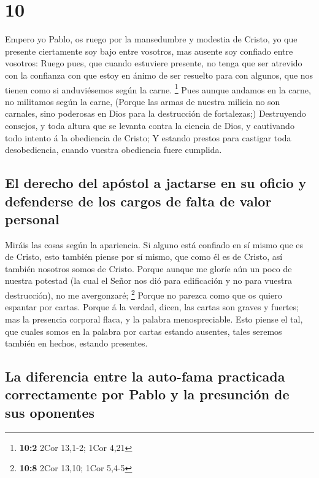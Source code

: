 \hypertarget{section-9}{%
\section{10}\label{section-9}}

 Empero yo Pablo, os ruego por la mansedumbre y modestia de
Cristo, yo que presente ciertamente soy bajo entre vosotros, mas ausente
soy confiado entre vosotros:  Ruego pues, que cuando
estuviere presente, no tenga que ser atrevido con la confianza con que
estoy en ánimo de ser resuelto para con algunos, que nos tienen como si
anduviésemos según la carne. \footnote{\textbf{10:2} 2Cor 13,1-2; 1Cor
  4,21}  Pues aunque andamos en la carne, no militamos según
la carne,  (Porque las armas de nuestra milicia no son
carnales, sino poderosas en Dios para la destrucción de fortalezas;)
 Destruyendo consejos, y toda altura que se levanta contra
la ciencia de Dios, y cautivando todo intento á la obediencia de Cristo;
 Y estando prestos para castigar toda desobediencia, cuando
vuestra obediencia fuere cumplida.

\hypertarget{el-derecho-del-apuxf3stol-a-jactarse-en-su-oficio-y-defenderse-de-los-cargos-de-falta-de-valor-personal}{%
\subsection{El derecho del apóstol a jactarse en su oficio y defenderse
de los cargos de falta de valor
personal}\label{el-derecho-del-apuxf3stol-a-jactarse-en-su-oficio-y-defenderse-de-los-cargos-de-falta-de-valor-personal}}

 Miráis las cosas según la apariencia. Si alguno está
confiado en sí mismo que es de Cristo, esto también piense por sí mismo,
que como él es de Cristo, así también nosotros somos de Cristo.
 Porque aunque me gloríe aún un poco de nuestra potestad (la
cual el Señor nos dió para edificación y no para vuestra destrucción),
no me avergonzaré; \footnote{\textbf{10:8} 2Cor 13,10; 1Cor 5,4-5}
 Porque no parezca como que os quiero espantar por cartas.
 Porque á la verdad, dicen, las cartas son graves y
fuertes; mas la presencia corporal flaca, y la palabra menospreciable.
 Esto piense el tal, que cuales somos en la palabra por
cartas estando ausentes, tales seremos también en hechos, estando
presentes.

\hypertarget{la-diferencia-entre-la-auto-fama-practicada-correctamente-por-pablo-y-la-presunciuxf3n-de-sus-oponentes}{%
\subsection{La diferencia entre la auto-fama practicada correctamente
por Pablo y la presunción de sus
oponentes}\label{la-diferencia-entre-la-auto-fama-practicada-correctamente-por-pablo-y-la-presunciuxf3n-de-sus-oponentes}}

